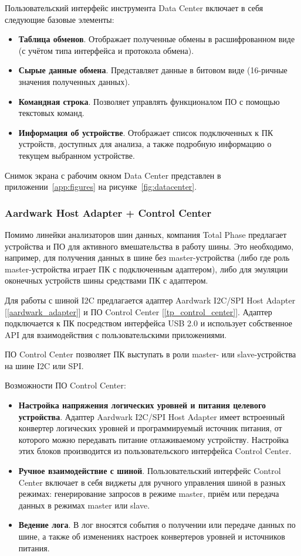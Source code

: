 Пользовательский интерфейс инструмента Data Center включает в себя следующие базовые элементы:

\begin{itemize}
 \item \textbf{Таблица обменов}. Отображает полученные обмены в расшифрованном виде (с учётом типа интерфейса и протокола обмена).
 \item \textbf{Сырые данные обмена}. Представляет данные в битовом виде (16-ричные значения полученных данных).
 \item \textbf{Командная строка}. Позволяет управлять функционалом ПО с помощью текстовых команд.
 \item \textbf{Информация об устройстве}. Отображает список подключенных к ПК устройств, доступных для анализа, а также подробную информацию о текущем выбранном устройстве.
\end{itemize}

Снимок экрана с рабочим окном Data Center представлен в приложении~\ref{app:figures} на рисунке~\ref{fig:datacenter}.

\subsubsection{Aardwark Host Adapter + Control Center}

Помимо линейки анализаторов шин данных, компания Total Phase предлагает устройства и ПО для активного вмешательства в работу шины. Это необходимо, например, для получения данных в шине без master-устройства (либо где роль master-устройства играет ПК с подключенным адаптером), либо для эмуляции оконечных устройств шины средствами ПК с адаптером.

Для работы с шиной I2C предлагается адаптер Aardwark I2C/SPI Host Adapter [\ref{aardwark_adapter}] и ПО Control Center [\ref{tp_control_center}]. Адаптер подключается к ПК посредством интерфейса USB 2.0 и использует собственное API для взаимодействия с пользовательскими приложениями.

ПО Control Center позволяет ПК выступать в роли master- или slave-устройства на шине I2C или SPI.

Возможности ПО Control Center:

\begin{itemize}
 \item \textbf{Настройка напряжения логических уровней и питания целевого устройства}. Адаптер Aardwark I2C/SPI Host Adapter имеет встроенный конвертер логических уровней и программируемый источник питания, от которого можно передавать питание отлаживаемому устройству. Настройка этих блоков производится из пользовательского интерфейса Control Center.
 \item \textbf{Ручное взаимодействие с шиной}. Пользовательский интерфейс Control Center включает в себя виджеты для ручного управления шиной в разных режимах: генерирование запросов в режиме master, приём или передача данных в режимах master или slave.
 \item \textbf{Ведение лога}. В лог вносятся события о получении или передаче данных по шине, а также об изменениях настроек конвертеров уровней и источников питания.
\end{itemize}

